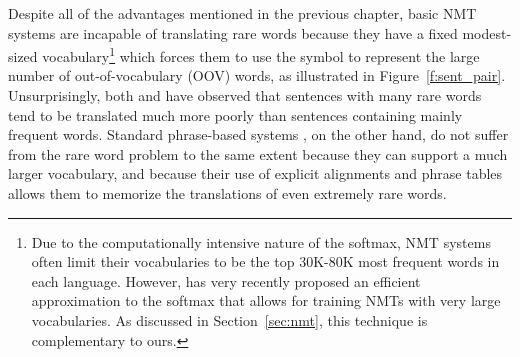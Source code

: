
Despite all of the advantages mentioned in the previous chapter, basic NMT systems are incapable of translating rare 
words because they have a fixed modest-sized vocabulary\footnote{ Due to the computationally intensive nature of the softmax, NMT systems often limit 
their vocabularies to be the top 30K-80K most frequent words in each language. However, 
has very recently proposed an efficient approximation to the softmax that allows
for training NMTs with very large vocabularies. As discussed in Section~\ref{sec:nmt}, this technique is complementary to ours.}
which forces them to use the \unksym{} symbol to 
represent the large number of out-of-vocabulary (OOV) words, as illustrated in Figure~\ref{f:sent_pair}.
Unsurprisingly, both  and  have
observed that sentences with many rare words tend to be translated much more poorly than sentences
containing mainly frequent words.
%
Standard phrase-based systems \cite{koehn2007moses,chiang07hiero,cer10phrasal,dyer10cdec}, 
on the other hand, do not suffer from the rare word 
problem to the same extent because they can support a much larger vocabulary, 
and because their use of explicit alignments
and phrase tables allows them to memorize the translations 
of even extremely rare words. 

